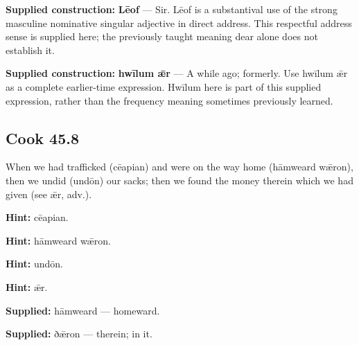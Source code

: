 \textbf{Supplied construction:} \textbf{Lēof} — Sir. Lēof is a substantival use of the strong masculine nominative singular adjective in direct address. This respectful address sense is supplied here; the previously taught meaning dear alone does not establish it.

\textbf{Supplied construction:} \textbf{hwīlum ǣr} — A while ago; formerly. Use hwīlum ǣr as a complete earlier-time expression. Hwīlum here is part of this supplied expression, rather than the frequency meaning sometimes previously learned.

\par\begin{minipage}{\linewidth}\raggedright
\subsection*{Cook 45.8}

When we had trafficked (cēapian) and were on the way home (hāmweard wǣron), then we undid (undōn) our sacks; then we found the money therein which we had given (see ǣr, adv.).

\textbf{Hint:} cēapian.

\textbf{Hint:} hāmweard wǣron.

\textbf{Hint:} undōn.

\textbf{Hint:} ǣr.

\end{minipage}\par\addvspace{4pt}

\textbf{Supplied:} hāmweard — homeward.

\textbf{Supplied:} ðǣron — therein; in it.

